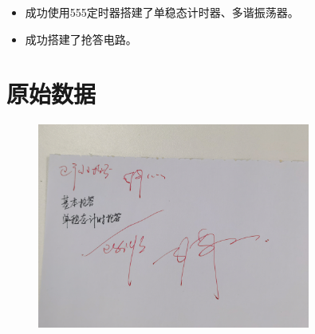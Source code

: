 \documentclass[UTF8]{ctexart}
\numberwithin{figure}{subsection}
\numberwithin{table}{subsection}
\numberwithin{equation}{subsection}
\begin{document}
\begin{itemize}
    \item 成功使用555定时器搭建了单稳态计时器、多谐振荡器。
    \item 成功搭建了抢答电路。
\end{itemize}

\section*{原始数据}



\begin{figure}[H]
    \begin{center}
        \includegraphics[width=0.8\textwidth]{responder_sign.jpg}
    \end{center}
\end{figure}
\end{document}
